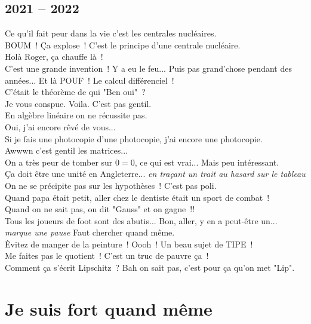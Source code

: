 \documentclass[french, a4paper, openany]{book}
\begin{document}
	\subsection*{2021 -- 2022}
		\noindent \og Ce qu'il fait peur dans la vie c'est les centrales nucléaires. \fg \\
		\og BOUM~! Ça explose~! C'est le principe d'une centrale nucléaire. \fg \\
		\og Holà Roger, ça chauffe là~! \fg \\
		\og C'est une grande invention~! Y a eu le feu... Puis pas grand'chose pendant des années... Et là POUF~! Le calcul différenciel~! \fg \\
		\og C'était le théorème de qui "Ben oui"~? \fg \\
		\og Je vous conspue. Voila. C'est pas gentil. \fg \\
		\og En algèbre linéaire on ne récussite pas. \fg \\
		\og Oui, j'ai encore rêvé de vous... \fg \\
		\og Si je fais une photocopie d'une photocopie, j'ai encore une photocopie. \fg \\
		\og Awwwn c'est gentil les matrices... \fg \\
		\og On a très peur de tomber sur $0 = 0$, ce qui est vrai... Mais peu intéressant. \fg \\
		\og Ça doit être une unité en Angleterre... \fg \emph{en traçant un trait au hasard sur le tableau} \\
		\og On ne se précipite pas sur les hypothèses~! C'est pas poli. \fg \\
		\og Quand papa était petit, aller chez le dentiste était un sport de combat~! \fg \\
		\og Quand on ne sait pas, on dit "Gauss" et on gagne~!! \fg \\
		\og Tous les joueurs de foot sont des abutis... Bon, aller, y en a peut-être un... \emph{marque une pause} Faut chercher quand même. \fg \\
		\og Êvitez de manger de la peinture~! Oooh~! Un beau sujet de TIPE~! \fg \\
		\og Me faites pas le quotient~! C'est un truc de pauvre ça~! \fg \\
		\og Comment ça s'écrit Lipschitz~? Bah on sait pas, c'est pour ça qu'on met "Lip". \fg \\

\section*{Je suis fort quand même}
\end{document}
